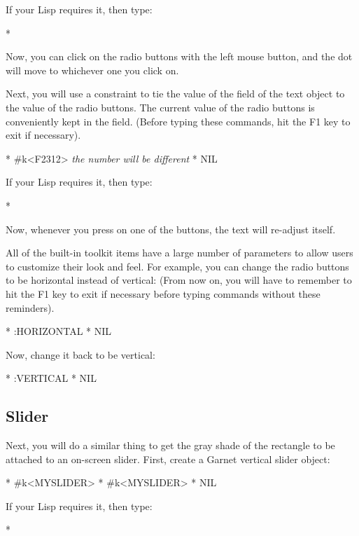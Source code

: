 If your Lisp requires it, then type:
\begin{programexample}
* 
\end{programexample}

Now, you can click on the radio buttons with the left mouse button, and the
dot will move to whichever one you click on.

Next, you will use a constraint to tie the value of the 
field of the text object to the value of the radio buttons.  The current
value of the radio buttons is conveniently kept in the  field.
(Before typing these commands, hit the F1 key to exit  
if necessary).

\begin{programexample}
* 
\#k<F2312>   {\it the number will be different}
* 
NIL
\end{programexample}
If your Lisp requires it, then type:
\begin{programexample}
* 
\end{programexample}

Now, whenever you press on one of the buttons, the text will re-adjust
itself.

All of the built-in toolkit items have a large number of parameters to
allow users to customize their look and feel.  For example, you can change
the radio buttons to be horizontal instead of vertical:
(From now on, you will have to remember to hit the F1 key to exit
 if necessary before typing commands without these
reminders).
\begin{programexample}
* 
:HORIZONTAL
* 
NIL
\end{programexample}

Now, change it back to be vertical:
\begin{programexample}
* 
:VERTICAL
* 
NIL
\end{programexample}

\subsection{Slider}

Next, you will do a similar thing to get the gray shade of the
rectangle to be attached to an on-screen slider.  First, create a Garnet
vertical slider object:
\begin{programexample}
* 
\#k<MYSLIDER>
* 
\#k<MYSLIDER>
* 
NIL
\end{programexample}
If your Lisp requires it, then type:
\begin{programexample}
* 
\end{programexample}

